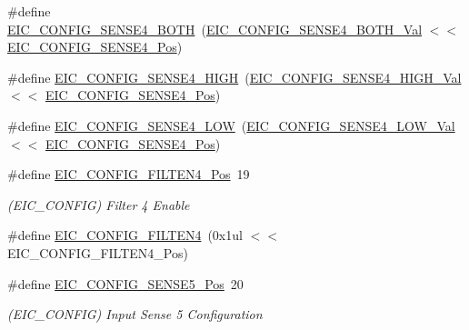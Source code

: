 \begin{DoxyCompactItemize}
\item 
\#define \mbox{\hyperlink{group___s_a_m_d21___e_i_c_ga44e9df8a2cd69346f9f43c98ce9d9a12}{E\+I\+C\+\_\+\+C\+O\+N\+F\+I\+G\+\_\+\+S\+E\+N\+S\+E4\+\_\+\+B\+O\+TH}}~(\mbox{\hyperlink{group___s_a_m_d21___e_i_c_ga90038bdcd72cf77acd74f46032eb292c}{E\+I\+C\+\_\+\+C\+O\+N\+F\+I\+G\+\_\+\+S\+E\+N\+S\+E4\+\_\+\+B\+O\+T\+H\+\_\+\+Val}}    $<$$<$ \mbox{\hyperlink{group___s_a_m_d21___e_i_c_gad23c76b1fbf7d30fa3aa738a38c453c3}{E\+I\+C\+\_\+\+C\+O\+N\+F\+I\+G\+\_\+\+S\+E\+N\+S\+E4\+\_\+\+Pos}})
\item 
\#define \mbox{\hyperlink{group___s_a_m_d21___e_i_c_gaaefb9ad90ae4dc4e600aef617e6ecf1d}{E\+I\+C\+\_\+\+C\+O\+N\+F\+I\+G\+\_\+\+S\+E\+N\+S\+E4\+\_\+\+H\+I\+GH}}~(\mbox{\hyperlink{group___s_a_m_d21___e_i_c_gaf61da74ee963e779f81a0fa2f81e9c75}{E\+I\+C\+\_\+\+C\+O\+N\+F\+I\+G\+\_\+\+S\+E\+N\+S\+E4\+\_\+\+H\+I\+G\+H\+\_\+\+Val}}    $<$$<$ \mbox{\hyperlink{group___s_a_m_d21___e_i_c_gad23c76b1fbf7d30fa3aa738a38c453c3}{E\+I\+C\+\_\+\+C\+O\+N\+F\+I\+G\+\_\+\+S\+E\+N\+S\+E4\+\_\+\+Pos}})
\item 
\#define \mbox{\hyperlink{group___s_a_m_d21___e_i_c_ga515a4fbaa282d5a49e1f322810888543}{E\+I\+C\+\_\+\+C\+O\+N\+F\+I\+G\+\_\+\+S\+E\+N\+S\+E4\+\_\+\+L\+OW}}~(\mbox{\hyperlink{group___s_a_m_d21___e_i_c_ga92370d05cd0d822893f57ecf0ff7a2a5}{E\+I\+C\+\_\+\+C\+O\+N\+F\+I\+G\+\_\+\+S\+E\+N\+S\+E4\+\_\+\+L\+O\+W\+\_\+\+Val}}     $<$$<$ \mbox{\hyperlink{group___s_a_m_d21___e_i_c_gad23c76b1fbf7d30fa3aa738a38c453c3}{E\+I\+C\+\_\+\+C\+O\+N\+F\+I\+G\+\_\+\+S\+E\+N\+S\+E4\+\_\+\+Pos}})
\item 
\#define \mbox{\hyperlink{group___s_a_m_d21___e_i_c_ga96cc4d08e7114ef41793a0323c1890fc}{E\+I\+C\+\_\+\+C\+O\+N\+F\+I\+G\+\_\+\+F\+I\+L\+T\+E\+N4\+\_\+\+Pos}}~19
\begin{DoxyCompactList}\small\item\em (E\+I\+C\+\_\+\+C\+O\+N\+F\+IG) Filter 4 Enable \end{DoxyCompactList}\item 
\#define \mbox{\hyperlink{group___s_a_m_d21___e_i_c_ga2f593f4ca6b61fc82cbe2e4900655fd5}{E\+I\+C\+\_\+\+C\+O\+N\+F\+I\+G\+\_\+\+F\+I\+L\+T\+E\+N4}}~(0x1ul $<$$<$ E\+I\+C\+\_\+\+C\+O\+N\+F\+I\+G\+\_\+\+F\+I\+L\+T\+E\+N4\+\_\+\+Pos)
\item 
\#define \mbox{\hyperlink{group___s_a_m_d21___e_i_c_gace7caae074bf08e88805b591c626fb7f}{E\+I\+C\+\_\+\+C\+O\+N\+F\+I\+G\+\_\+\+S\+E\+N\+S\+E5\+\_\+\+Pos}}~20
\begin{DoxyCompactList}\small\item\em (E\+I\+C\+\_\+\+C\+O\+N\+F\+IG) Input Sense 5 Configuration \end{DoxyCompactList}\item 

\end{DoxyCompactItemize}
